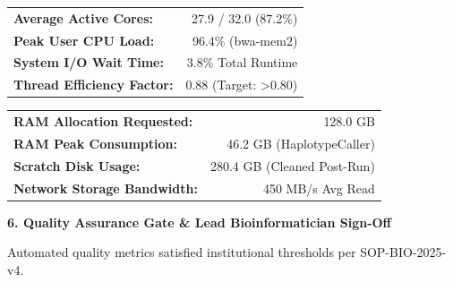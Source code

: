 \documentclass[10pt,a4paper]{article}
\newcommand{\sectionheading}[2]{%
  \vspace{6pt}%
  \begin{tcolorbox}[sectiontitle]%
    \normalsize\bfseries\color{NavyDark}#1 \quad \small\color{TextMuted}#2%
  \end{tcolorbox}%
  \vspace{2pt}%
}
\begin{document}
\noindent
\begin{minipage}[t]{0.49\textwidth}
  \begin{tcolorbox}[cardstyle, title={\color{NavyDark}\scriptsize\bfseries CPU Utilization Breakdown}]
    \scriptsize
    \begin{tabularx}{\textwidth}{@{} >{\bfseries}X r @{}}
      Average Active Cores: & 27.9 / 32.0 (87.2\%) \\
      Peak User CPU Load: & 96.4\% (bwa-mem2) \\
      System I/O Wait Time: & 3.8\% Total Runtime \\
      Thread Efficiency Factor: & 0.88 (Target: >0.80) \\
    \end{tabularx}
  \end{tcolorbox}
\end{minipage}%
\hfill
\begin{minipage}[t]{0.49\textwidth}
  \begin{tcolorbox}[cardstyle, title={\color{NavyDark}\scriptsize\bfseries Memory \& Storage I/O Profile}]
    \scriptsize
    \begin{tabularx}{\textwidth}{@{} >{\bfseries}X r @{}}
      RAM Allocation Requested: & 128.0 GB \\
      RAM Peak Consumption: & 46.2 GB (HaplotypeCaller) \\
      Scratch Disk Usage: & 280.4 GB (Cleaned Post-Run) \\
      Network Storage Bandwidth: & 450 MB/s Avg Read \\
    \end{tabularx}
  \end{tcolorbox}
\end{minipage}

\par\vspace{6pt}

\sectionheading{6. Quality Assurance Gate \& Lead Bioinformatician Sign-Off}{\faCheckCircle}

{\small Automated quality metrics satisfied institutional thresholds per SOP-BIO-2025-v4.}

\vspace{3pt}
\end{document}
